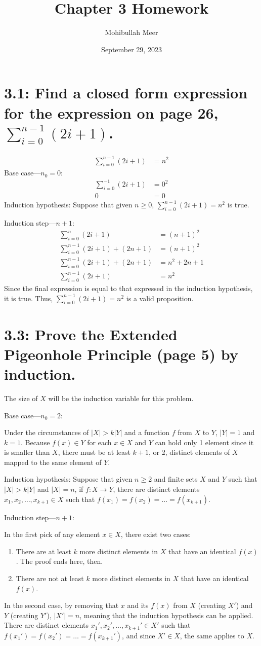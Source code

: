 \documentclass{article}
\title{Chapter 3 Homework}
\author{Mohibullah Meer}
\date{September 29, 2023}
\begin{document}
\maketitle
\section*{3.1: Find a closed form expression for the expression on page 26, $\sum_{i=0}^{n-1}(2i+1)$.}
\begin{align*}
  \sum_{i=0}^{n-1}(2i+1)&=n^2
\end{align*}
Base case---$n_0=0$:
\begin{align*}
  \sum_{i=0}^{-1}(2i+1)&=0^2\\
  0&=0
\end{align*}
Induction hypothesis: Suppose that given $n\geq0$, $\sum_{i=0}^{n-1}(2i+1)=n^2$ is true.

Induction step---$n+1$:
\begin{align*}
  \sum_{i=0}^{n}(2i+1)&=(n+1)^2\\
  \sum_{i=0}^{n-1}(2i+1)+(2n+1)&=(n+1)^2\\
  \sum_{i=0}^{n-1}(2i+1)+(2n+1)&=n^2+2n+1\\
  \sum_{i=0}^{n-1}(2i+1)&=n^2
\end{align*}
Since the final expression is equal to that expressed in the induction hypothesis, it is true. Thus, $\sum_{i=0}^{n-1}(2i+1)=n^2$ is a valid proposition.
\section*{3.3: Prove the Extended Pigeonhole Principle (page 5) by induction.}
The size of $X$ will be the induction variable for this problem.

Base case---$n_0=2$:

Under the circumstances of $|X|>k|Y|$ and a function $f$ from $X$ to $Y$, $|Y|=1$ and $k=1$. Because $f(x)\in Y$ for each $x\in X$ and $Y$ can hold only 1 element since it is smaller than $X$, there must be at least $k+1$, or 2, distinct elements of $X$ mapped to the same element of $Y$.

Induction hypothesis: Suppose that given $n\geq2$ and finite sets $X$ and $Y$ such that $|X|>k|Y|$ and $|X|=n$, if $f: X\rightarrow Y$, there are distinct elements $x_1, x_2, \ldots, x_{k+1}\in X$ such that $f(x_1)=f(x_2)=\ldots=f(x_{k+1})$.

Induction step---$n+1$:

In the first pick of any element $x\in X$, there exist two cases:
\begin{enumerate}
\item There are at least $k$ more distinct elements in $X$ that have an identical $f(x)$. The proof ends here, then.
\item There are not at least $k$ more distinct elements in $X$ that have an identical $f(x)$.
\end{enumerate}
In the second case, by removing that $x$ and its $f(x)$ from $X$ (creating $X'$) and $Y$ (creating $Y'$), $|X'|=n$, meaning that the induction hypothesis can be applied. There are distinct elements $x_1', x_2', \ldots, x_{k+1}'\in X'$ such that $f(x_1')=f(x_2')=\ldots=f(x_{k+1}')$, and since $X'\in X$, the same applies to $X$.
\end{document}
